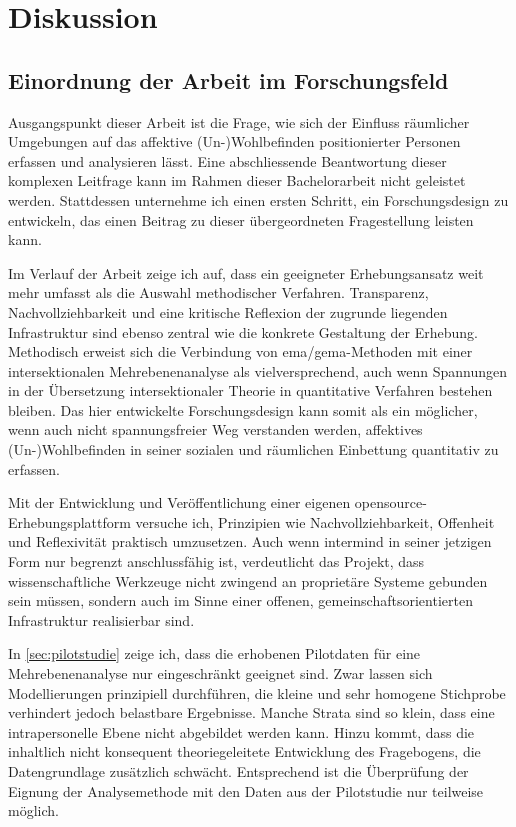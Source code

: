 \chapter{Diskussion} \label{sec:diskussion}

\section{Einordnung der Arbeit im Forschungsfeld}

Ausgangspunkt dieser Arbeit ist die Frage, wie sich der Einfluss räumlicher Umgebungen auf das affektive (Un-)Wohlbefinden  positionierter Personen erfassen und analysieren lässt. Eine abschliessende Beantwortung dieser komplexen Leitfrage kann im Rahmen dieser Bachelorarbeit nicht geleistet werden. Stattdessen unternehme ich einen ersten Schritt, ein Forschungsdesign zu entwickeln, das einen Beitrag zu dieser übergeordneten Fragestellung leisten kann.

Im Verlauf der Arbeit zeige ich auf, dass ein geeigneter Erhebungsansatz weit mehr umfasst als die Auswahl methodischer Verfahren. Transparenz, Nachvollziehbarkeit und eine kritische Reflexion der zugrunde liegenden Infrastruktur sind ebenso zentral wie die konkrete Gestaltung der Erhebung. Methodisch erweist sich die Verbindung von \gls{ema}/\gls{gema}-Methoden mit einer intersektionalen Mehrebenenanalyse als vielversprechend, auch wenn Spannungen in der Übersetzung intersektionaler Theorie in quantitative Verfahren bestehen bleiben. Das hier entwickelte Forschungsdesign kann somit als ein möglicher, wenn auch nicht spannungsfreier Weg verstanden werden, affektives (Un-)Wohlbefinden in seiner sozialen und räumlichen Einbettung quantitativ zu erfassen.

Mit der Entwicklung und Veröffentlichung einer eigenen \gls{opensource}-Erhebungsplattform versuche ich, Prinzipien wie Nachvollziehbarkeit, Offenheit und Reflexivität praktisch umzusetzen. Auch wenn \gls{intermind} in seiner jetzigen Form nur begrenzt anschlussfähig ist, verdeutlicht das Projekt, dass wissenschaftliche Werkzeuge nicht zwingend an proprietäre Systeme gebunden sein müssen, sondern auch im Sinne einer offenen, gemeinschaftsorientierten Infrastruktur realisierbar sind.

In \cref{sec:pilotstudie} zeige ich, dass die erhobenen Pilotdaten für eine  Mehrebenenanalyse nur eingeschränkt geeignet sind. Zwar lassen sich Modellierungen prinzipiell durchführen, die kleine und sehr homogene Stichprobe verhindert jedoch belastbare Ergebnisse. Manche Strata sind so klein, dass eine intrapersonelle Ebene nicht abgebildet werden kann. Hinzu kommt, dass die inhaltlich nicht konsequent theoriegeleitete Entwicklung des Fragebogens, die Datengrundlage zusätzlich schwächt. Entsprechend ist die Überprüfung der Eignung der Analysemethode mit den Daten aus der Pilotstudie nur teilweise möglich.

